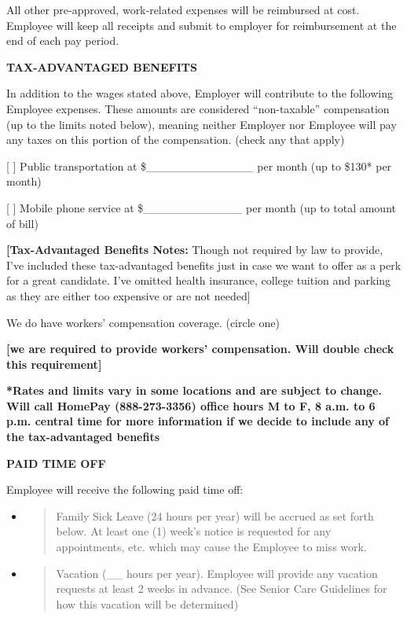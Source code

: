\documentclass[]{article}
\begin{document}
All other pre-approved, work-related expenses will be reimbursed at
cost. Employee will keep all receipts and submit to employer for
reimbursement at the end of each pay period.

\textbf{TAX-ADVANTAGED BENEFITS}

In addition to the wages stated above, Employer will contribute to the
following Employee expenses. These amounts are considered
``non-taxable'' compensation (up to the limits noted below), meaning
neither Employer nor Employee will pay any taxes on this portion of the
compensation. (check any that apply)

[ ] Public transportation at \$\_\_\_\_\_\_\_\_\_\_\_\_\_ per month (up to
\$130* per month)

[ ] Mobile phone service at \$\_\_\_\_\_\_\_\_\_\_\_\_ per month (up to
total amount of bill)

\textbf{{[}Tax-Advantaged Benefits Notes:} Though not required by law to
provide, I've included these tax-advantaged benefits just in case we
want to offer as a perk for a great candidate. I've omitted health
insurance, college tuition and parking as they are either too expensive
or are not needed{]}

We do have workers' compensation coverage. (circle one)

\textbf{{[}we are required to provide workers' compensation. Will double
check this requirement{]}}

\textbf{*Rates and limits vary in some locations and are subject to
change. Will call HomePay (888-273-3356) office hours M to F, 8 a.m. to
6 p.m. central time for more information if we decide to include any of
the tax-advantaged benefits}

\textbf{PAID TIME OFF}

Employee will receive the following paid time off:

\begin{itemize}
\item
  \begin{quote}
  Family Sick Leave (24 hours per year) will be accrued as set forth
  below. At least one (1) week's notice is requested for any
  appointments, etc. which may cause the Employee to miss work.
  \end{quote}
\end{itemize}

\begin{itemize}
\item
  \begin{quote}
  Vacation (\_\_ hours per year). Employee will provide any vacation
  requests at least 2 weeks in advance. (See Senior Care Guidelines for
  how this vacation will be determined)
  \end{quote}
\end{itemize}
\end{document}
